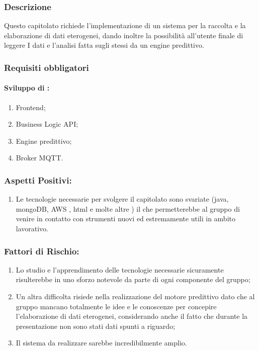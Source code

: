 \documentclass[12pt,a4paper]{article}
\begin{document}
\subsubsection{Descrizione}

Questo capitolato richiede l'implementazione di un sistema per la  raccolta e la elaborazione di dati eterogenei, dando inoltre la possibilità all'utente finale di leggere I dati e l'analisi fatta sugli stessi da un engine predittivo.
\subsubsection{Requisiti obbligatori}  
\paragraph{Sviluppo di :}	
	\begin{enumerate}
	\item Frontend;
	\item Business Logic API; 
	\item Engine predittivo;
	\item Broker MQTT. 
	\end{enumerate}

\subsubsection{Aspetti Positivi:}
\begin{enumerate}
\item	Le tecnologie necessarie per svolgere il capitolato sono svariate (java, mongoDB, AWS , html e molte altre ) il che permetterebbe al gruppo di venire in contatto con strumenti nuovi ed estremamente utili in ambito lavorativo.
\end{enumerate}
\subsubsection{Fattori di Rischio:}
	\begin{enumerate}
\item	Lo studio e l'apprendimento delle tecnologie necessarie sicuramente risulterebbe in uno sforzo notevole da parte di ogni componente del gruppo;

\item	Un altra difficolta risiede nella realizzazione del motore predittivo dato che al gruppo mancano totalmente le idee e le conoscenze per concepire l'elaborazione di dati eterogenei, considerando anche il fatto che durante la presentazione non sono	stati dati spunti a riguardo;
\item	Il sistema da realizzare sarebbe incredibilmente amplio.
\end{enumerate}
\end{document}
